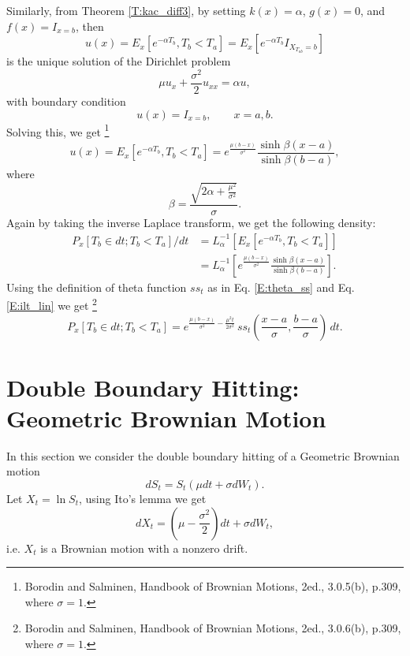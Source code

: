 Similarly, from Theorem \ref{T:kac_diff3}, by setting $k(x)=\alpha$, $g(x)=0$, 
and $f(x)=I_{x=b}$, then 
\[
	u(x) = E_x[e^{-\alpha T_b}, T_b<T_a] 
	= E_x[e^{-\alpha T_b} I_{X_{T_{ab}}=b}]
\]
is the unique solution of the Dirichlet problem
\[
	 \mu u_{x} + \frac{\sigma^2}{2} u_{xx} = \alpha u,
\]
with boundary condition
\[
	u(x)= I_{x=b}, \qquad x=a,b.
\]
Solving this, we get
\footnote{Borodin and Salminen, Handbook of Brownian Motions, 2ed., 3.0.5(b),
  p.309, where $\sigma=1$.}
\begin{equation}
	u(x) = E_x[e^{-\alpha T_b}, T_b<T_a] 
	     = e^{\frac{\mu (b-x)}{\sigma^2} } 
	       \frac{\sinh \beta (x-a)}{\sinh \beta(b-a)},
\end{equation}
where 
\[
	\beta = \frac{\sqrt{2\alpha+\frac{\mu^2}{\sigma^2}}}{\sigma}.
\]
Again by taking the inverse Laplace transform, we get the following density:
\begin{align*}
	P_x[T_b\in dt; T_b<T_a]/dt 
	&= L_{\alpha}^{-1} \left[  E_x[e^{-\alpha T_b}, T_b<T_a] \right] \\
	&= L_{\alpha}^{-1} 
	   \left[ 
		  e^{\frac{\mu (b-x)}{\sigma^2} } \frac{\sinh \beta (x-a)}{\sinh \beta(b-a)}
     \right]. 
\end{align*}
Using the definition of theta function $ss_t$ as in Eq. \ref{E:theta_ss} and Eq.
\ref{E:ilt_lin} we get
\footnote{Borodin and Salminen, Handbook of Brownian Motions, 2ed., 3.0.6(b),
  p.309, where $\sigma=1$.}
\begin{equation}
	P_x[T_b\in dt; T_b<T_a]  
	= e^{\frac{\mu (b-x)}{\sigma^2} - \frac{\mu^2 t}{2\sigma^2}}  \,
	  ss_t \left( \frac{x-a}{\sigma}, \frac{b-a}{\sigma} \right) \, dt.
\end{equation}










\section{Double Boundary Hitting: Geometric Brownian Motion}
In this section we consider the double boundary hitting of a Geometric Brownian 
motion 
\[
	dS_t = S_t(\mu dt + \sigma dW_t).
\]
Let $X_t = \ln{S_t}$, using Ito's lemma we get
\[
	dX_t = (\mu-\frac{\sigma^2}{2})dt + \sigma dW_t,
\]
i.e. $X_t$ is a Brownian motion with a nonzero drift.

